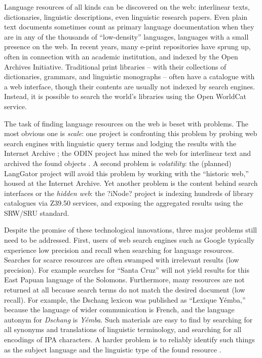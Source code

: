 
Language resources of all kinds can be discovered on the web:
interlinear texts, dictionaries, linguistic descriptions, even
linguistic research papers.  Even plain text documents sometimes count
as primary language documentation when they are in any of the
thousands of ``low-density'' languages, languages with a small
presence on the web.  In recent years, many e-print repositories have
sprung up, often in connection with an academic institution, and
indexed by the Open Archives Initiative.  Traditional print libraries
-- with their collections of dictionaries, grammars, and linguistic
monographs -- often have a catalogue with a web interface, though
their contents are usually not indexed by search engines.  Instead,
it is possible to search the world's libraries using the Open WorldCat
service.


The task of finding language resources on the web is beset with
problems.  The most obvious one is \emph{scale}: one project is
confronting this problem by probing web search engines with linguistic
query terms and lodging the results with the Internet Archive
\citep{BaldwinBird06}; the ODIN project has mined the web for
interlinear text and archived the found objects
\citep{Langendoen02,Lewis03}.  A second problem is \emph{volatility}:
the (planned) LangGator project will avoid this problem by working
with the ``historic web,'' housed at the Internet Archive.  Yet
another problem is the content behind search interfaces or the
\emph{hidden web}: the ?iNode? project is indexing hundreds of library
catalogues via Z39.50 services, and exposing the aggregated results
using the SRW/SRU standard.


Despite the promise of these technological innovations, three major
problems still need to be addressed.
First, users of web search engines such as Google typically experience
low precision and recall when searching for language resources.
Searches for scarce resources are often swamped with irrelevant
results (low precision).  For example searches for ``Santa Cruz'' will
not yield results for this East Papuan language of the Solomons.
Furthermore, many resources are not returned at all because search
terms do not match the desired document (low recall).  For example,
the Dschang lexicon \cite{BirdTadadjeu97} was published as
``Lexique Y\'emba,'' because the language of wider communication is
French, and the language autonym for \textit{Dschang} is \textit{Y\'emba}.
Such materials are easy to find by searching for all synonyms and
translations of linguistic terminology, and searching for all
encodings of IPA characters.  A harder problem is to
reliably identify such things as the subject language and the
linguistic type of the found resource \citep{HughesBaldwin06lrec}.


